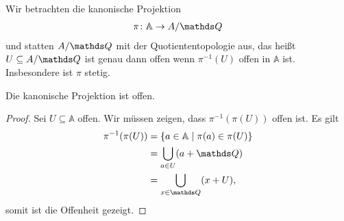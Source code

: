Wir betrachten die kanonische Projektion
\begin{align*}
\pi \colon \mathbb{A} \to A/\Q
\end{align*}
und statten $A/\Q$ mit der Quotiententopologie aus, das heißt $U \subseteq A/\Q$ ist genau dann offen wenn $\pi^{-1}(U)$ offen in $\mathbb{A}$ ist.
Insbesondere ist $\pi$ stetig.
\begin{prop}
Die kanonische Projektion ist offen.
\end{prop}
\begin{proof}
Sei $U\subseteq \mathbb{A}$ offen. Wir müssen zeigen, dass $\pi^{-1}(\pi(U))$ offen ist.
Es gilt
\begin{align*}
\pi^{-1}(\pi(U))&=\{a \in \mathbb{A} \mid \pi(a)\in \pi(U)\}\\
&=\bigcup_{a \in U} (a+\Q)\\
&=\bigcup_{x\in \Q} (x+U),
\end{align*}
somit ist die Offenheit gezeigt.
\end{proof}

